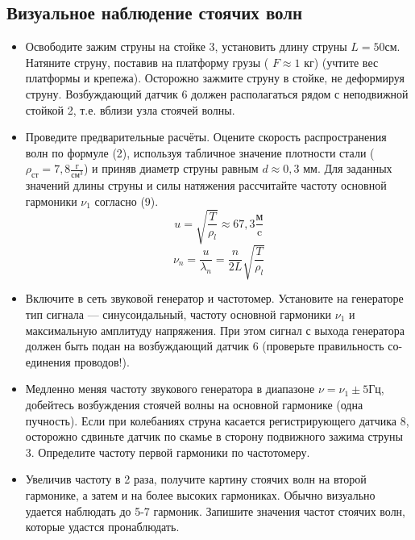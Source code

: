 \documentclass[a4paper,12pt]{article} %
\begin{document}
\subsection{Визуальное наблюдение стоячих волн}
\begin{itemize}

\item Освободите зажим струны на стойке 3, установить длину струны $L = 50\text{см}$. Натяните струну, поставив на платформу грузы ( $F \approx 1$ кг) (учтите вес платформы и крепежа). Осторожно зажмите струну в стойке, не деформируя струну. Возбуждающий датчик 6 должен располагаться рядом с неподвижной стойкой 2, т.е. вблизи узла стоячей волны.

\item Проведите предварительные расчёты. Оцените скорость распространения волн по формуле (2), используя табличное значение плотности стали ($\rho_\text{ст} = 7,8 \frac{\text{г}}{\text{см}^3}$) и приняв диаметр струны равным $d \approx 0,3$ мм. Для заданных значений длины струны и силы натяжения рассчитайте частоту основной гармоники $\nu_1$ согласно (9).
\[u = \sqrt{\frac{T}{\rho_l}} \approx 67,3 \frac{\text{м}}{\text{c}}\]
\[\nu_n = \frac{u}{\lambda_n}=\frac{n}{2L}\sqrt{\frac{T}{\rho_l}}\]
\item Включите в сеть звуковой генератор и частотомер. Установите на генераторе тип сигнала — синусоидальный, частоту основной гармоники $\nu_1$ и максимальную амплитуду напряжения. При этом сигнал с выхода генератора должен быть подан на возбуждающий датчик 6 (проверьте правильность со-единения проводов!).

\item Медленно меняя частоту звукового генератора в диапазоне $\nu = \nu_1 \pm 5$Гц, добейтесь возбуждения стоячей волны на основной гармонике (одна пучность). Если при колебаниях струна касается регистрирующего датчика 8, осторожно сдвиньте датчик по скамье в сторону подвижного зажима струны 3. Определите частоту первой гармоники по частотомеру.

\item Увеличив частоту в 2 раза, получите картину стоячих волн на второй гармонике, а затем и на более высоких гармониках. Обычно визуально удается наблюдать до 5-7 гармоник. Запишите значения частот стоячих волн, которые удастся пронаблюдать.
\end{itemize}
\end{document}
